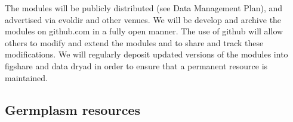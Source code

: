 The modules will be publicly distributed (see Data Management Plan), and advertised via evoldir and other venues. We will be develop and archive the modules on github.com in a fully open manner. The use of github will allow others to modify and extend the modules and to share and track these modifications. We will regularly deposit updated versions of the modules into figshare and data dryad in order to ensure that a permanent resource is maintained. 

\subsection*{Germplasm resources} %





